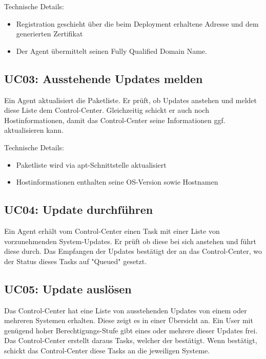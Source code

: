 Technische Details:

\begin{itemize}
    \item Registration geschieht über die beim Deployment erhaltene Adresse und dem generierten Zertifikat
    \item Der Agent übermittelt seinen Fully Qualified Domain Name.
\end{itemize}

\subsection{UC03: Ausstehende Updates melden}

Ein Agent aktualisiert die Paketliste. Er prüft, ob Updates anstehen und meldet diese Liste dem Control-Center. Gleichzeitig schickt er auch noch Hostinformationen, damit das Control-Center seine Informationen ggf. aktualisieren kann.

Technische Details:

\begin{itemize}
    \item Paketliste wird via apt-Schnittstelle aktualisiert
    \item Hostinformationen enthalten seine OS-Version sowie Hostnamen
\end{itemize}

\subsection{UC04: Update durchführen}

Ein Agent erhält vom Control-Center einen Task mit einer Liste von vorzunehmenden System-Updates. Er prüft ob diese bei sich anstehen und führt diese durch. Das Empfangen der Updates bestätigt der an das Control-Center, wo der Status dieses Tasks auf "Queued" gesetzt.

\subsection{UC05: Update auslösen}

Das Control-Center hat eine Liste von ausstehenden Updates von einem oder mehreren Systemen erhalten. Diese zeigt es in einer Übersicht an. Ein User mit genügend hoher Berechtigungs-Stufe gibt eines oder mehrere dieser Updates frei. Das Control-Center erstellt daraus Tasks, welcher der bestätigt. Wenn bestätigt, schickt das Control-Center diese Tasks an die jeweiligen Systeme.

